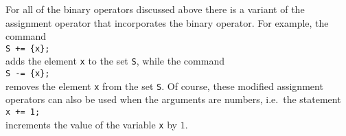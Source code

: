 For all of the binary operators discussed above there is a variant of
the assignment operator that incorporates the binary operator.  For example, the command
\\[0.2cm]
\hspace*{1.3cm}
\texttt{S += \{x\};}
\\[0.2cm]
adds the element \texttt{x} to the set \texttt{S}, while the command
\\[0.2cm]
\hspace*{1.3cm}
\texttt{S -= \{x\};}
\\[0.2cm]
removes the element \texttt{x} from the set \texttt{S}.  Of course,
these modified assignment operators can also be used when the arguments are numbers, i.e.~the statement
\\[0.2cm]
\hspace*{1.3cm}
\texttt{x += 1;}
\\[0.2cm]
increments the value of the variable \texttt{x} by $1$.
\vspace*{0.2cm}

